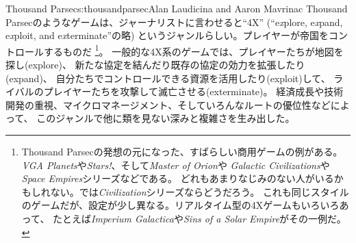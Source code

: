 \begin{aosachapter}{Thousand Parsec}{s:thousandparsec}{Alan Laudicina and Aaron Mavrinac}
Thousand Parsecのようなゲームは、ジャーナリストに言わせると``4X''
(``e\emph{x}plore, e\emph{x}pand, e\emph{x}ploit, and e\emph{x}terminate''の略)
というジャンルらしい。プレイヤーが帝国をコントロールするものだ
\footnote{Thousand Parsecの発想の元になった、すばらしい商用ゲームの例がある。
\emph{VGA Planets}や\emph{Stars!}、そして\emph{Master of Orion}や
\emph{Galactic Civilizations}や\emph{Space Empires}シリーズなどである。
どれもあまりなじみのない人がいるかもしれない。では\emph{Civilization}シリーズならどうだろう。
これも同じスタイルのゲームだが、設定が少し異なる。リアルタイム型の4Xゲームもいろいろあって、
たとえば\emph{Imperium Galactica}や\emph{Sins of a Solar Empire}がその一例だ。}。
一般的な4X系のゲームでは、プレイヤーたちが地図を探し(explore)、
新たな協定を結んだり既存の協定の効力を拡張したり(expand)、
自分たちでコントロールできる資源を活用したり(exploit)して、
ライバルのプレイヤーたちを攻撃して滅亡させる(exterminate)。
経済成長や技術開発の重視、マイクロマネージメント、そしていろんなルートの優位性などによって、
このジャンルで他に類を見ない深みと複雑さを生み出した。


\end{aosachapter}
